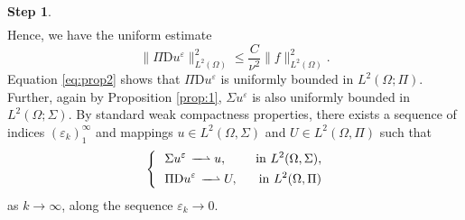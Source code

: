 \documentclass{amsart}
\numberwithin{equation}{section}
\numberwithin{thm}{section}
\theoremstyle{definition}
\newtheorem{proofpart}{Step}
\renewcommand{\:}{\!:\!} %
\newcommand{\e}{\varepsilon}
\newcommand{\Si}{\Sigma}
\newcommand{\weak }{\, -\!\!\!\!\!-\!\!\!\!\rightharpoonup}
\renewcommand{\^}[1]{^{#1}_{\phantom{l}}}
\begin{document}
\begin{proofpart}
\[\begin{split}
\end{split}
\]
Hence, we have the uniform estimate
\begin{equation} \label{eq:prop2}
 \| \Pi \mathrm{D}u^\varepsilon \| ^2_{L^2(\Omega)} \leq \frac{C}{\nu^2}\| f \| ^2_{L^2(\Omega)} .
\end{equation}
Equation \eqref{eq:prop2} shows that $\Pi \mathrm{D}u^\varepsilon$ is uniformly bounded in $L^2(\Omega;\Pi)$. Further, again by Proposition \ref{prop:1}, $\Sigma u^\varepsilon$ is also uniformly bounded in $L^2(\Omega;\Si)$. By standard weak compactness properties, there exists a sequence of indices $(\e_k)_1^\infty$ and mappings $u \in L^2(\Omega, \Sigma)$ and $U \in L^2(\Omega, \Pi)$ such that 
\begin{equation} \label{eq:20B}
\left\{ \ \ 
\begin{split}
&\Sigma u^{\varepsilon} \weak u, \hspace{0.2cm} & \text{in $L^2(\Omega, \Sigma)$}, 
\\
&\Pi \mathrm{D}u^{\varepsilon} \weak U, \hspace{0.2cm} & \text{in $L^2(\Omega, \Pi)$}
\end{split}
\right.
\end{equation}
as $k \rightarrow \infty$, along the sequence $\varepsilon_k \rightarrow 0$. 
\end{proofpart}
\end{document}
